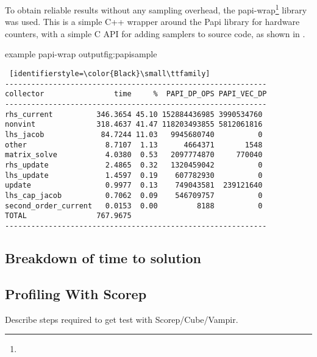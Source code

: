 To obtain reliable results without any sampling overhead, the papi-wrap\footnote{} library was used. This is a simple C++ wrapper around the Papi library for hardware counters, with a simple C API for adding samplers to source code, as shown in .


\begin{myfigure}{example papi-wrap output}{fig:papisample}
\begin{center}
\begin{lstlisting} [identifierstyle=\color{Black}\small\ttfamily]
------------------------------------------------------------
collector                time     %  PAPI_DP_OPS PAPI_VEC_DP
------------------------------------------------------------
rhs_current          346.3654 45.10 152884436985 3990534760
nonvint              318.4637 41.47 118203493855 5812061816
lhs_jacob             84.7244 11.03   9945680740          0
other                  8.7107  1.13      4664371       1548
matrix_solve           4.0380  0.53   2097774870     770040
rhs_update             2.4865  0.32   1320459042          0
lhs_update             1.4597  0.19    607782930          0
update                 0.9977  0.13    749043581  239121640
lhs_cap_jacob          0.7062  0.09    546709757          0
second_order_current   0.0153  0.00         8188          0
TOTAL                767.9675
------------------------------------------------------------
\end{lstlisting}
\end{center}
\end{myfigure}

\subsection{Breakdown of time to solution}

\subsection{Profiling With Scorep}
\label{sec:scorep}
\begin{todo}
Describe steps required to get test with Scorep/Cube/Vampir.
\end{todo}

